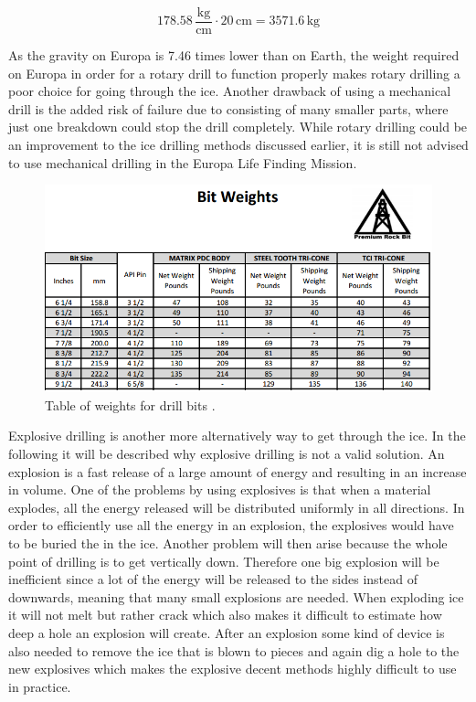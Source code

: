 \begin{equation}
178.58 \, \frac{\mathrm{kg}}{\mathrm{cm}} \cdot 20 \, \mathrm{cm} = 3571.6 \, \mathrm{kg}
\end{equation}

As the gravity on Europa is 7.46  times lower than on Earth, the weight required on Europa in order for a rotary drill to function properly makes rotary drilling a poor choice for going through the ice. Another drawback of using a mechanical drill is the added risk of failure due to consisting of many smaller parts, where just one breakdown could stop the drill completely. While rotary drilling could be an improvement to the ice drilling methods discussed earlier, it is still not advised to use mechanical drilling in the Europa Life Finding Mission. 

\begin{figure}[h]
\begin{center}
\includegraphics[scale=0.9]{figures/RCS/drill_bit_weight}
\caption{Table of weights for drill bits \cite{RotDrillWieght}.}
\label{fig:drill_bit_weight}
\end{center}
\end{figure}


Explosive drilling is another more alternatively way to get through the ice. In the following it will be described why explosive drilling is not a valid solution. An explosion is a fast release of a large amount of energy and resulting in an increase in volume. One of the problems by using explosives is that when a material explodes, all the energy released will be distributed uniformly in all directions. In order to efficiently use all the energy in an explosion, the explosives would have to be buried the in the ice. Another problem will then arise because the whole point of drilling is to get vertically down. Therefore one big explosion will be inefficient since a lot of the energy will be released to the sides instead of downwards, meaning that many small explosions are needed. When exploding ice it will not melt but rather crack which also makes it difficult to estimate how deep a hole an explosion will create. After an explosion some kind of device is also needed to remove the ice that is blown to pieces and again dig a hole to the new explosives which makes the explosive decent methods highly difficult to use in practice. \\

